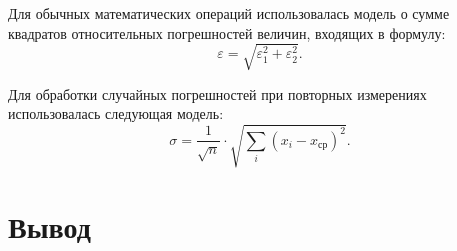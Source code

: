 \documentclass[a4paper,12pt]{extarticle}
\begin{document}
Для обычных математических операций использовалась модель о сумме квадратов относительных погрешностей величин, входящих в формулу:
$$ \varepsilon = \sqrt{\varepsilon_1^2 + \varepsilon_2^2}.$$

Для обработки случайных погрешностей при повторных измерениях использовалась следующая модель:
$$\sigma = \frac{1}{\sqrt{n}} \cdot \sqrt{\sum_i(x_i - x_\text{ср})^2}.$$


\section{Вывод}
\end{document}
